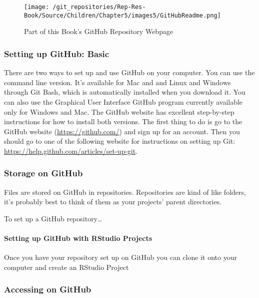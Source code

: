 \begin{figure}[t]
    \caption{Part of this Book's GitHub Repository Webpage}
    \label{BookRepository}
    \begin{center}
    \texttt{[image: /git\_repositories/Rep-Res-Book/Source/Children/Chapter5/images5/GitHubReadme.png]}
    \end{center}
\end{figure}

\subsubsection{Setting up GitHub: Basic}

There are two ways to set up and use GitHub on your computer. You can use the command line version. It's available for Mac and and Linux and Windows through Git Bash, which is automatically installed when you download it. You can also use the Graphical User Interface GitHub program currently available only for Windows and Mac. The GitHub website has excellent step-by-step instructions for how to install both versions. The first thing to do is go to the GitHub website (\url{https://github.com/}) and sign up for an account. Then you should go to one of the following website for instructions on setting up Git: \url{https://help.github.com/articles/set-up-git}.



\subsubsection{Storage on GitHub}

Files are stored on GitHub in repositories. Repositories are kind of like folders, it's probably best to think of them as your projects' parent directories.

To set up a GitHub repository\ldots

\paragraph{Setting up GitHub with RStudio Projects}

Once you have your repository set up on GitHub you can clone it onto your computer and create an RStudio Project

\subsubsection{Accessing on GitHub}

